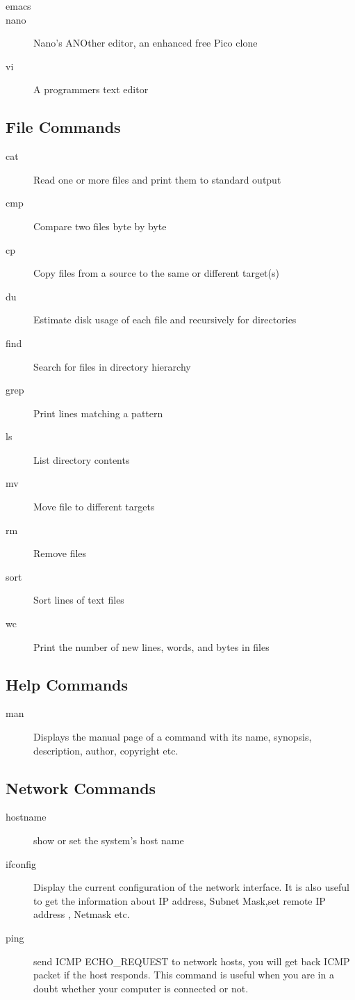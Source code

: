 \begin{description}
  \item[emacs]
  \item[nano] Nano's ANOther editor, an enhanced free Pico clone
  \item[vi] A programmers text editor
\end{description}


\subsection{File Commands}
\begin{description}
  \item[cat] Read one or more files and print them to standard output
  \item[cmp] Compare two files byte by byte
  \item[cp] Copy files from a source to the same or different target(s)
  \item[du] Estimate disk usage of each file and recursively for directories
  \item[find] Search for files in directory hierarchy
  \item[grep] Print lines matching a pattern
  \item[ls] List directory contents
  \item[mv] Move file to different targets
  \item[rm] Remove files
  \item[sort] Sort lines of text files
  \item[wc] Print the number of new lines, words, and bytes in files
\end{description}

\subsection{Help Commands}

\begin{description}
  \item[man] Displays the manual page of a command with its name, synopsis, description, author, copyright etc.
\end{description}

\subsection{Network Commands}
\begin{description}
  \item[hostname] show or set the system's host name
  \item[ifconfig] Display the current configuration of the network interface. It is also useful to get the information about IP address, Subnet Mask,set remote IP address , Netmask etc.
  \item[ping] send ICMP ECHO\_REQUEST to network hosts, you will get back ICMP packet if the host responds.  This command is useful when you are in a doubt whether your computer is connected or not.

\end{description}

